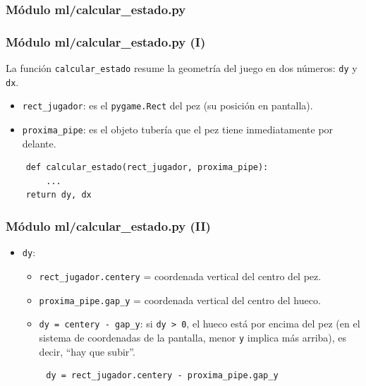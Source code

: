 \documentclass[
	11pt, %
]{beamer}
\begin{document}

\subsubsection{Módulo ml/calcular\_estado.py}


\begin{frame}[fragile]
\frametitle{Módulo ml/calcular\_estado.py (I)}

La función \texttt{calcular\_estado} resume la geometría del juego
en dos números: \texttt{dy} y \texttt{dx}.


\begin{itemize}
    \item \texttt{rect\_jugador}: es el \texttt{pygame.Rect} del pez (su posición en pantalla).
    \item \texttt{proxima\_pipe}: es el objeto tubería que el pez tiene inmediatamente por delante.
\end{itemize}

{\scriptsize
\begin{verbatim}
    def calcular_estado(rect_jugador, proxima_pipe):
        ...
    return dy, dx
\end{verbatim}
}

\end{frame}


\begin{frame}[fragile]
\frametitle{Módulo ml/calcular\_estado.py (II)}

\begin{itemize}
    \item \texttt{dy}:
    \begin{itemize}
        \item \texttt{rect\_jugador.centery} = coordenada vertical del centro del pez.
        \item \texttt{proxima\_pipe.gap\_y} = coordenada vertical del centro del hueco.
        \item \texttt{dy = centery - gap\_y}: si \texttt{dy > 0}, el hueco está por encima del pez
              (en el sistema de coordenadas de la pantalla, menor \texttt{y} implica más arriba),
              es decir, “hay que subir”.
    \end{itemize}
\end{itemize}

{\scriptsize
\begin{verbatim}
        dy = rect_jugador.centery - proxima_pipe.gap_y
\end{verbatim}
}

\end{frame}
\end{document}
